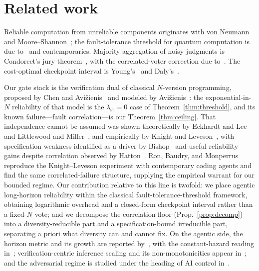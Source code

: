 \documentclass[11pt]{article}
\theoremstyle{remark}
\newcommand{\lst}{\lambda_{\mathrm{st}}}
\begin{document}
\section{Related work}\label{sec:related}
Reliable computation from unreliable components originates with von Neumann~\cite{vonneumann1956}
and Moore--Shannon~\cite{moore1956};
the fault-tolerance threshold for quantum computation is due
to~\cite{aharonov1997} and contemporaries.
Majority aggregation of noisy judgments is Condorcet's
jury theorem~\cite{condorcet1785}, with the correlated-voter correction due to~\cite{ladha1992}.
The cost-optimal checkpoint interval is Young's~\cite{young1974} and Daly's~\cite{daly2006}.

Our gate stack is the verification dual of classical $N$-version programming, proposed by Chen and
Avi\v{z}ienis~\cite{avizienis1978} and modeled by Avi\v{z}ienis~\cite{avizienis1985}: the
exponential-in-$N$ reliability of that model is the $\lst=0$ case of
Theorem~\ref{thm:threshold}, and its known failure---fault correlation---is our
Theorem~\ref{thm:ceiling}.
That independence cannot be assumed was shown theoretically by Eckhardt
and Lee~\cite{eckhardt1985} and Littlewood and Miller~\cite{littlewood1989}, and empirically by
Knight and Leveson~\cite{knight1986,brilliant1990}, with specification weakness identified as a
driver by Bishop~\cite{bishop1988} and useful reliability gains despite correlation observed by
Hatton~\cite{hatton1997}.
Ron, Baudry, and Monperrus~\cite{ron2026} reproduce the
Knight--Leveson experiment with contemporary coding agents and find the same correlated-failure
structure, supplying the empirical warrant for our bounded regime.
Our contribution relative to
this line is twofold: we place agentic long-horizon reliability within the classical
fault-tolerance-threshold framework, obtaining logarithmic overhead and a closed-form checkpoint
interval rather than a fixed-$N$ vote;
and we decompose the correlation floor
(Prop.~\ref{prop:decomp}) into a diversity-reducible part and a specification-bound irreducible
part, separating a priori what diversity can and cannot fix.
On the agentic side, the horizon metric and its growth are reported by~\cite{metr2025}, with the
constant-hazard reading in~\cite{ord2025};
verification-centric inference scaling and its
non-monotonicities appear in~\cite{brown2024}; and the adversarial regime is studied under the
heading of AI control in~\cite{greenblatt2024}.
\end{document}
